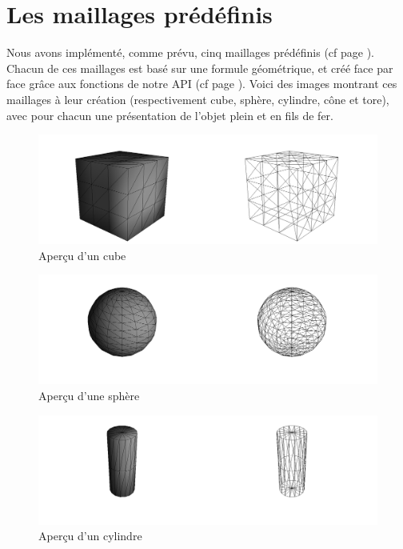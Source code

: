 \documentclass[a4paper]{memoir}
\begin{document}
		\section{Les maillages prédéfinis}
			Nous avons implémenté, comme prévu, cinq maillages prédéfinis (cf page \pageref{model-cdc}). Chacun de ces maillages est basé sur une formule 
			géométrique, et créé face par face grâce aux fonctions de notre API (cf page \pageref{api-dev}). Voici des images montrant ces maillages à 
			leur création (respectivement cube, sphère, cylindre, cône et tore), avec pour chacun une présentation de l'objet plein et en fils de fer.
			\begin{figure}[H]
				\hspace{-2cm} \includegraphics[scale=0.27]{img/cube.png}
				\caption{Aperçu d'un cube}
			\end{figure}
			\begin{figure}[H]
				\vspace{-0,5cm} \hspace{-2cm} \includegraphics[scale=0.27]{img/sphere.png}
				\caption{Aperçu d'une sphère}
			\end{figure}
			\begin{figure}[H]
				\vspace{-0,5cm} \hspace{-2cm} \includegraphics[scale=0.27]{img/cylinder.png}
				\caption{Aperçu d'un cylindre}
			\end{figure}
\end{document}

